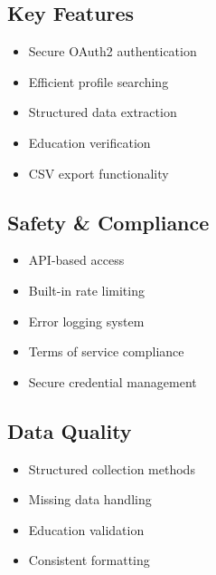 \documentclass{article}
\begin{document}
\subsection{Key Features}
\begin{itemize}
    \item Secure OAuth2 authentication
    \item Efficient profile searching
    \item Structured data extraction
    \item Education verification
    \item CSV export functionality
\end{itemize}

\subsection{Safety \& Compliance}
\begin{itemize}
    \item API-based access
    \item Built-in rate limiting
    \item Error logging system
    \item Terms of service compliance
    \item Secure credential management
\end{itemize}

\subsection{Data Quality}
\begin{itemize}
    \item Structured collection methods
    \item Missing data handling
    \item Education validation
    \item Consistent formatting
\end{itemize}
\end{document}
